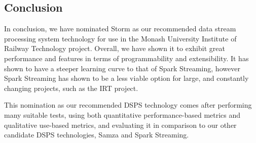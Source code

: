 \subsection{Conclusion} %
\label{sub:evaluation_conclusion}

In conclusion, we have nominated Storm as our recommended data stream processing system technology for use in the Monash
University Institute of Railway Technology project. Overall, we have shown it to exhibit great performance and features
in terms of programmability and extensibility. It has shown to have a steeper learning curve to that of Spark Streaming,
however Spark Streaming has shown to be a less viable option for large, and constantly changing projects, such as the IRT
project.

This nomination as our recommended DSPS technology comes after performing many suitable tests, using both quantitative performance-based
metrics and qualitative use-based metrics, and evaluating it in comparison to our other candidate DSPS technologies, Samza and Spark Streaming.


